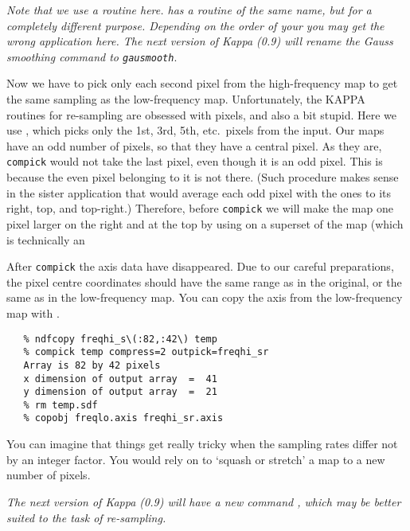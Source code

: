    {\it Note that we use a
   routine here.
   has a routine of the same name, but for a completely different
   purpose. Depending on the order of your
   you may get the wrong application here.
   The next version of Kappa (0.9) will rename the Gauss smoothing
   command to\/ \tt gausmooth}.

   Now we have to pick only each second pixel from the high-frequency
   map to get the same sampling as the low-frequency map. Unfortunately,
   the KAPPA routines for re-sampling are obsessed with pixels, and also
   a bit stupid. Here we use
{\tt {}},
   which picks only
   the 1st, 3rd, 5th, etc.\ pixels from the input. Our maps have an
   odd number of pixels, so that they have a central pixel. As they are,
   {\tt compick} would not take the last pixel, even though it is an
   odd pixel. This is because the even pixel belonging to it is
   not there. (Such procedure makes sense in the sister application
{\tt {}}
   that would average each odd pixel with the ones to
   its right, top, and top-right.)
   Therefore, before {\tt compick} we
   will make the map one pixel larger on the right and at the top by
   using
{\tt {}}
   on a superset of the map (which is technically an

   After {\tt compick} the axis data have disappeared. Due to our
   careful preparations, the pixel centre coordinates should have the
   same range as in the original, or the same as in the low-frequency
   map. You can copy the axis from the low-frequency map with
{\tt {}}.

\begin{verbatim}
   % ndfcopy freqhi_s\(:82,:42\) temp
   % compick temp compress=2 outpick=freqhi_sr
   Array is 82 by 42 pixels
   x dimension of output array  =  41
   y dimension of output array  =  21
   % rm temp.sdf
   % copobj freqlo.axis freqhi_sr.axis
\end{verbatim}

   You can imagine that things get really tricky when the sampling rates
   differ not by an integer factor. You would rely on
{\tt {}}
   to `squash or stretch' a map to a new number of pixels.

   {\it The next version of Kappa (0.9) will have a new command\/
{\tt {}},
   which may be better suited to the task of re-sampling.}

